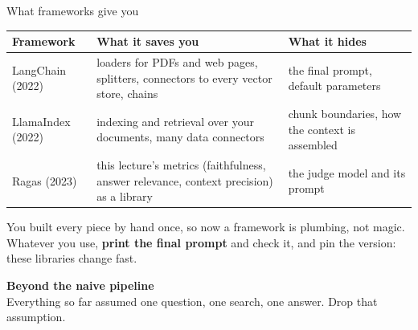 \documentclass[aspectratio=169]{beamer}
\newcommand{\takebox}[1]{%
  \begin{tcolorbox}[colback=paramgreen!8, colframe=paramgreen, boxrule=0.6pt, arc=2pt]
  #1
  \end{tcolorbox}}
\newcommand{\sectiontransition}[2]{%
  \begin{frame}[plain]
    \vfill
    \begin{center}
      {\Huge\bfseries\color{popblue} #1}\\[1.1em]
      {\large #2}
    \end{center}
    \vfill
  \end{frame}}
\begin{document}
\begin{frame}{What frameworks give you}
  \vspace{0.4em}
  \begin{center}
  \small
  \begin{tabular}{>{\raggedright\arraybackslash}p{}>{\raggedright\arraybackslash}p{}>{\raggedright\arraybackslash}p{}}
    \toprule
    \textbf{Framework} & \textbf{What it saves you} & \textbf{What it hides} \\
    \midrule
    LangChain (2022)  & loaders for PDFs and web pages, splitters, connectors to every vector store, chains
                      & the final prompt, default parameters \\
    LlamaIndex (2022) & indexing and retrieval over your documents, many data connectors
                      & chunk boundaries, how the context is assembled \\
    Ragas (2023)      & this lecture's metrics (faithfulness, answer relevance, context precision) as a library
                      & the judge model and its prompt \\
    \bottomrule
  \end{tabular}
  \end{center}

  \vspace{0.5em}
  \takebox{You built every piece by hand once, so now a framework is plumbing, not magic. Whatever you use,
  \textbf{print the final prompt} and check it, and pin the version: these libraries change fast.}
\end{frame}

\sectiontransition{Beyond the naive pipeline}{Everything so far assumed one question, one
search, one answer. Drop that assumption.}
\end{document}
